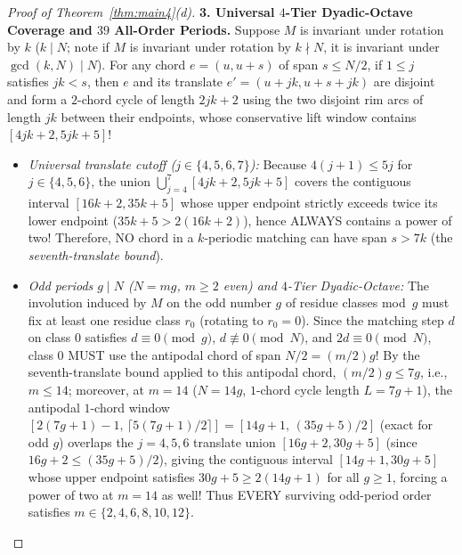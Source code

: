 \documentclass[11pt,reqno]{amsart}
\theoremstyle{plain}
\theoremstyle{definition}
\theoremstyle{remark}
\DeclareRobustCommand{\_}{\ifmmode\text{\textunderscore}\else\textunderscore\allowbreak\fi}
\begin{document}
\begin{proof}[Proof of Theorem~\ref{thm:main4}(d)]
\medskip
\noindent\textbf{3. Universal $4$-Tier Dyadic-Octave Coverage and $39$ All-Order Periods.}
Suppose $M$ is invariant under rotation by $k$ ($k \mid N$; note if $M$ is invariant under rotation by $k \nmid N$, it is invariant under $\gcd(k, N) \mid N$). For any chord $e = (u, u + s)$ of span $s \le N/2$, if $1 \le j$ satisfies $j k < s$, then $e$ and its translate $e' = (u + jk, u + s + jk)$ are disjoint and form a $2$-chord cycle of length $2jk + 2$ using the two disjoint rim arcs of length $jk$ between their endpoints, whose conservative lift window contains $[4jk + 2, 5jk + 5]$!
\begin{itemize}[leftmargin=1.6em]
  \item \emph{Universal translate cutoff ($j \in \{4, 5, 6, 7\}$):} Because $4(j + 1) \le 5j$ for $j \in \{4, 5, 6\}$, the union $\bigcup_{j=4}^7 [4jk + 2, 5jk + 5]$ covers the contiguous interval $[16k + 2, 35k + 5]$ whose upper endpoint strictly exceeds twice its lower endpoint ($35k + 5 > 2(16k + 2)$), hence ALWAYS contains a power of two! Therefore, NO chord in a $k$-periodic matching can have span $s > 7k$ (the \emph{seventh-translate bound}).
  \item \emph{Odd periods $g \mid N$ ($N = m g$, $m \ge 2$ even) and $4$-Tier Dyadic-Octave:} The involution induced by $M$ on the odd number $g$ of residue classes mod~$g$ must fix at least one residue class $r_0$ (rotating to $r_0 = 0$). Since the matching step $d$ on class $0$ satisfies $d \equiv 0 \pmod{g}$, $d \not\equiv 0 \pmod{N}$, and $2d \equiv 0 \pmod{N}$, class $0$ MUST use the antipodal chord of span $N/2 = (m/2) g$! By the seventh-translate bound applied to this antipodal chord, $(m/2)g \le 7g$, i.e., $m \le 14$; moreover, at $m = 14$ ($N = 14g$, $1$-chord cycle length $L = 7g + 1$), the antipodal $1$-chord window $[2(7g + 1) - 1,\, \lceil 5(7g + 1)/2 \rceil] = [14g + 1,\, (35g + 5)/2]$ (exact for odd $g$) overlaps the $j = 4, 5, 6$ translate union $[16g + 2, 30g + 5]$ (since $16g + 2 \le (35g + 5)/2$), giving the contiguous interval $[14g + 1, 30g + 5]$ whose upper endpoint satisfies $30g + 5 \ge 2(14g + 1)$ for all $g \ge 1$, forcing a power of two at $m = 14$ as well! Thus EVERY surviving odd-period order satisfies $m \in \{2, 4, 6, 8, 10, 12\}$.
  

\end{itemize}
\end{proof}
\end{document}
